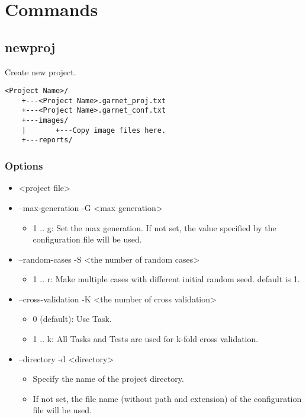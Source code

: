 \documentclass[]{article}
\author{}
\date{}
\begin{document}
{
\hypersetup{linkcolor=black}
\setcounter{tocdepth}{3}
\tableofcontents
}
\section{Commands}\label{commands}

\subsection{newproj}\label{newproj}

Create new project.

\begin{verbatim}
<Project Name>/
    +---<Project Name>.garnet_proj.txt
    +---<Project Name>.garnet_conf.txt
    +---images/
    |       +---Copy image files here.
    +---reports/
\end{verbatim}

\subsubsection{Options}\label{options}

\begin{itemize}
\itemsep1pt\parskip0pt
\item
  \textless{}project file\textgreater{}
\item
  --max-generation -G \textless{}max generation\textgreater{}

  \begin{itemize}
  \itemsep1pt\parskip0pt
  \item
    1 .. g: Set the max generation. If not set, the value specified by
    the configuration file will be used.
  \end{itemize}
\item
  --random-cases -S \textless{}the number of random cases\textgreater{}

  \begin{itemize}
  \itemsep1pt\parskip0pt
  \item
    1 .. r: Make multiple cases with different initial random seed.
    default is 1.
  \end{itemize}
\item
  --cross-validation -K \textless{}the number of cross
  validation\textgreater{}

  \begin{itemize}
  \itemsep1pt\parskip0pt
  \item
    0 (default): Use Task.
  \item
    1 .. k: All Tasks and Tests are used for k-fold cross validation.
  \end{itemize}
\item
  --directory -d \textless{}directory\textgreater{}

  \begin{itemize}
  \itemsep1pt\parskip0pt
  \item
    Specify the name of the project directory.
  \item
    If not set, the file name (without path and extension) of the
    configuration file will be used.
  \end{itemize}
\end{itemize}
\end{document}
